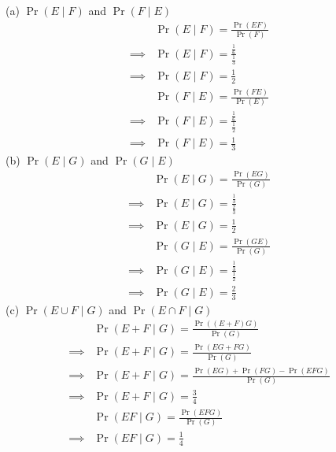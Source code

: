 \documentclass{article}
\providecommand{\pr}[1]{\ensuremath{\Pr\left(#1\right)}}
\providecommand{\pr}[1]{\ensuremath{\Pr\left(#1\right)}}
\begin{document}
\begin{enumerate}[label=13.\arabic{enumi}.\arabic{enumii}]
(a) $\pr{E \mid F}$ and $\pr{F \mid E}$
\begin{align}
&\pr{E \mid F} = \frac{\pr{EF}}{\pr{F}}&\\
\implies &\pr{E \mid F} = \frac{\frac{1}{6}}{\frac{1}{3}}&\\
\implies &\pr{E \mid F} = \frac{1}{2}&\\
&\pr{F \mid E} = \frac{\pr{FE}}{\pr{E}}&\\
\implies &\pr{F \mid E} = \frac{\frac{1}{6}}{\frac{1}{2}}&\\
\implies &\pr{F \mid E} = \frac{1}{3}&
\end{align}
(b) $\pr{E \mid G}$ and $\pr{G \mid E}$
\begin{align}
&\pr{E \mid G} = \frac{\pr{EG}}{\pr{G}}&\\
\implies &\pr{E \mid G} = \frac{\frac{1}{3}}{\frac{2}{3}}&\\
\implies &\pr{E \mid G} = \frac{1}{2}&\\
&\pr{G \mid E} = \frac{\pr{GE}}{\pr{G}}&\\
\implies &\pr{G \mid E} = \frac{\frac{1}{3}}{\frac{1}{2}}&\\
\implies &\pr{G \mid E} = \frac{2}{3}&
\end{align}
(c) $\pr{{E \cup F} \mid G}$ and $\pr{{E \cap F} \mid G}$
\begin{align}
&\pr{{E+F} \mid G} = \frac{\pr{{(E+F)}G}}{\pr{G}}&\\
\implies &\pr{{E+F} \mid G} = \frac{\pr{{EG+F}G}}{\pr{G}}&\\
\implies &\pr{{E+F} \mid G} = \frac{\pr{EG}+\pr{FG}-\pr{EFG}}{\pr{G}}&\\
\implies &\pr{{E+F} \mid G} = \frac{3}{4}&\\
&\pr{{EF} \mid G} = \frac{\pr{EFG}}{\pr{G}}&\\
\implies &\pr{{EF} \mid G} = \frac{1}{4}&
\end{align}
\end{enumerate}
\end{document}
